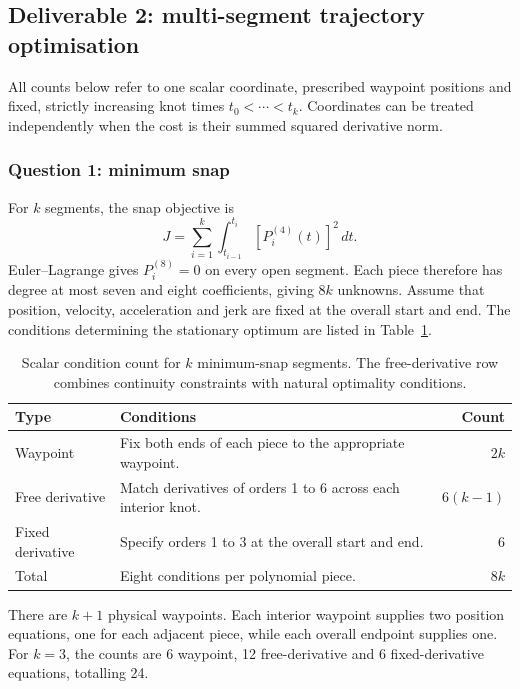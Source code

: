 \documentclass[12pt,a4paper,twoside]{article}
\begin{document}
\subsection{Deliverable 2: multi-segment trajectory optimisation}
All counts below refer to one scalar coordinate, prescribed waypoint positions and
fixed, strictly increasing knot times $t_0<\cdots<t_k$. Coordinates can be treated
independently when the cost is their summed squared derivative norm.

\subsubsection{Question 1: minimum snap}
For $k$ segments, the snap objective is
\begin{equation}
J=\sum_{i=1}^{k}\int_{t_{i-1}}^{t_i}[P_i^{(4)}(t)]^2\,dt.
\end{equation}
Euler--Lagrange gives $P_i^{(8)}=0$ on every open segment. Each piece therefore
has degree at most seven and eight coefficients, giving $8k$ unknowns.
Assume that position, velocity, acceleration and jerk are fixed at the overall
start and end. The conditions determining the stationary optimum are listed in
Table~\ref{tab:counts}.

\begin{table}[htbp]
\centering\small
\caption{Scalar condition count for $k$ minimum-snap segments. The free-derivative
row combines continuity constraints with natural optimality conditions.}
\label{tab:counts}
\begin{tabularx}{\linewidth}{@{}lXr@{}}
\toprule
Type & Conditions & Count\\\midrule
Waypoint & Fix both ends of each piece to the appropriate waypoint. & $2k$\\
Free derivative & Match derivatives of orders 1 to 6 across each interior knot. & $6(k-1)$\\
Fixed derivative & Specify orders 1 to 3 at the overall start and end. & $6$\\\midrule
Total & Eight conditions per polynomial piece. & $8k$\\\bottomrule
\end{tabularx}
\end{table}

There are $k+1$ physical waypoints. Each interior waypoint supplies two position
equations, one for each adjacent piece, while each overall endpoint supplies one.
For $k=3$, the counts are 6 waypoint, 12 free-derivative
and 6 fixed-derivative equations, totalling 24.
\end{document}
